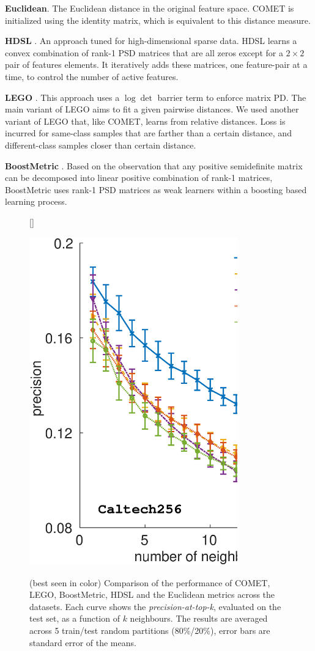 \documentclass{article} %
\begin{document}
\textbf{Euclidean}. The Euclidean distance in the original feature space. COMET is initialized using the identity matrix, which is equivalent to this distance measure.

\textbf{HDSL} \cite{hdsl}. An approach tuned for high-dimensional sparse data. HDSL learns a convex combination of rank-1 PSD matrices that are all zeros except for a $2\times2$ pair of features elements. It iteratively adds these matrices, one feature-pair at a time, to control the number of active features.

\textbf{LEGO} \cite{lego}. This approach uses a $\log \det$ barrier term to enforce matrix PD. The main variant of LEGO aims to fit a given pairwise distances. We used another variant of LEGO that, like COMET, learns from relative distances. Loss is incurred for same-class samples that are farther than a certain distance, and different-class samples closer than certain distance.

\textbf{BoostMetric} \cite{boost}. Based on the observation that any positive semidefinite matrix can be decomposed into linear positive combination of rank-1 matrices, BoostMetric uses rank-1 PSD matrices as weak learners within a boosting based learning process.
\begin{figure}[h]
[\FBwidth]
{\caption{(best seen in color) Comparison of the performance of COMET, LEGO, BoostMetric, HDSL and the Euclidean metrics across the datasets. Each curve shows the \textit{precision-at-top-k}, evaluated on the test set, as a function of $k$ neighbours. The results are averaged across 5 train/test random partitions (80\%/20\%), error bars are standard error of the means.}\label{precFig}}
{\includegraphics[width=9cm]{Precision_at_K_all_datasets_NIPS}}
\end{figure}
\end{document}
